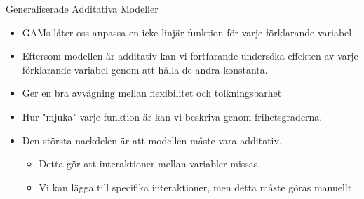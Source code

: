 \documentclass[10pt,english]{beamer}
\begin{document}
\begin{frame}{Generaliserade Additativa Modeller}
    
    \begin{itemize}
        \item GAMs låter oss anpassa en icke-linjär funktion för varje förklarande variabel.
        \item Eftersom modellen är additativ kan vi fortfarande undersöka effekten av varje förklarande variabel genom att hålla de andra konstanta.
        \item Ger en bra avvägning mellan flexibilitet och tolkningsbarhet
        \item Hur "mjuka" varje funktion är kan vi beskriva genom frihetsgraderna. 
        \item Den största nackdelen är att modellen måste vara additativ.
        \begin{itemize}
            \item Detta gör att interaktioner mellan variabler missas.
            \item Vi kan lägga till specifika interaktioner, men detta måste göras manuellt.
        \end{itemize}
    \end{itemize}

\end{frame}
\end{document}
